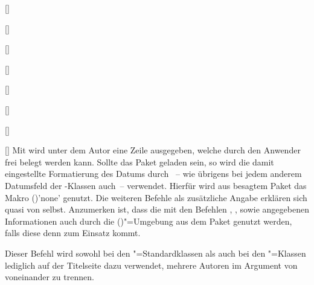 \begin{Declaration*}{}
\begin{Declaration*}{}
\begin{Declaration*}{}
\begin{Declaration}{[]}
\begin{Declaration}{[]}
\begin{Declaration}{[]}
\begin{Declaration}{[]}
\begin{Declaration}{[]}
\begin{Declaration}{[]}
\begin{Declaration}{[]}
\begin{Declaration}{[]}
Mit  wird unter dem Autor eine Zeile ausgegeben, welche 
durch den Anwender frei belegt werden kann. Sollte das Paket  
geladen sein, so wird die damit eingestellte Formatierung des Datums durch 
~-- wie übrigens bei jedem anderem Datumsfeld der 
\TUDScript-Klassen auch~-- verwendet. Hierfür wird aus besagtem Paket das Makro 
()'none' genutzt. Die weiteren Befehle als 
zusätzliche Angabe erklären sich quasi von selbst. Anzumerken ist, dass die mit 
den Befehlen , ,  
sowie  angegebenen Informationen auch durch die 
()"=Umgebung aus dem Paket 
 genutzt werden, falls diese denn zum Einsatz kommt.
\end{Declaration}
\end{Declaration}
\end{Declaration}
\end{Declaration}
\end{Declaration}
\end{Declaration}
\end{Declaration}
\end{Declaration}

\begin{Declaration}{}
\printdeclarationlist%
%
%
Dieser Befehl wird sowohl bei den "=Standardklassen als auch bei 
den \KOMAScript"=Klassen lediglich auf der Titelseite dazu verwendet, mehrere 
Autoren im Argument von  voneinander zu trennen.


\end{Declaration}
\end{Declaration*}
\end{Declaration*}
\end{Declaration*}
